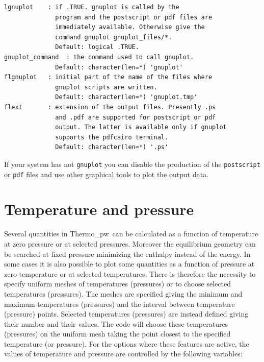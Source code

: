 \documentclass[12pt,a4paper,twoside]{report}
\def\thermo{{\sc Thermo}\_{\sc pw}}
\begin{document}
\begin{verbatim}
lgnuplot    : if .TRUE. gnuplot is called by the 
              program and the postscript or pdf files are 
              immediately available. Otherwise give the 
              command gnuplot gnuplot_files/*.
              Default: logical .TRUE.
gnuplot_command  : the command used to call gnuplot.
              Default: character(len=*) 'gnuplot'
flgnuplot   : initial part of the name of the files where 
              gnuplot scripts are written.
              Default: character(len=*) 'gnuplot.tmp'
flext       : extension of the output files. Presently .ps 
              and .pdf are supported for postscript or pdf 
              output. The latter is available only if gnuplot 
              supports the pdfcairo terminal.
              Default: character(len=*) '.ps'
\end{verbatim}

If your system has not \texttt{gnuplot}
you can disable the production of the \texttt{postscript} or 
\texttt{pdf} files and use other
graphical tools to plot the output data. 

\newpage
{\color{coral}\section{Temperature and pressure}}
\color{black}
Several quantities in \thermo\ can be calculated as a function of temperature
at zero pressure or at selected pressures.
Moreover the equilibrium geometry can be searched at fixed pressure 
minimizing the enthalpy instead of the energy.
In some cases it is also possible to plot some quantities as a function 
of pressure at zero temperature or at selected temperatures.
There is therefore the necessity to specify uniform meshes of temperatures
(pressures) or to choose selected temperatures (pressures). 
The meshes are specified giving the minimum and maximum temperatures 
(pressures) and the interval between temperature (pressure) points.
Selected temperatures (pressures) are instead defined giving their number 
and their values. The code will choose these temperatures (pressures) on 
the uniform mesh taking the point closest to the specified temperature 
(or pressure).
For the options where these features are active, the values of temperature
and pressure are controlled by the following variables:
\end{document}
